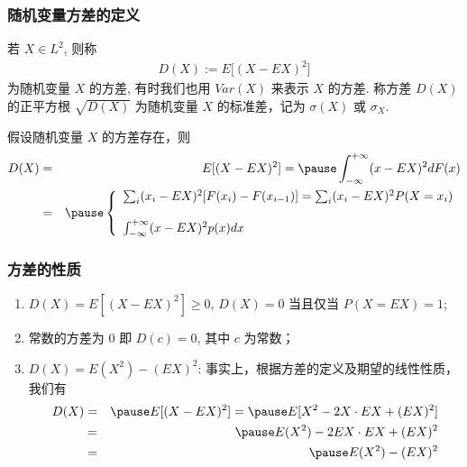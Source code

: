 \documentclass[Prob-All.tex]{subfiles}
\begin{document}
	\begin{frame}
		\frametitle{随机变量方差的定义}
		\begin{defi}
			若 $X\in L^2$, 则称%
			\begin{eqnarray*}
				D(X):=E\big[(X-EX)^2\big]
			\end{eqnarray*}
			为随机变量 $X$ 的方差, 有时我们也用 $Var (X)$ 来表示 $X$ 的方差. 称方差 $D (X)$ 的正平方根 $\sqrt{D (X)}$ 为随机变量 $X$ 的标准差，记为 $\sigma (X)$ 或 $\sigma_X$.
		\end{defi}
		\pause
		\begin{thm}
			假设随机变量 $X$ 的方差存在，则
			\begin{eqnarray*}
				D(X)&=&E[(X-EX)^2]=\pause \int_{-\infty}^{+\infty}(x-EX)^2dF(x)\\
				&=&\pause \left\{
				\begin{array}{l}
					\sum_{i}(x_i-EX)^2[F(x_i)-F(x_{i-1})]=\sum_{i}(x_i-EX)^2P(X=x_i)\\
					\\
					\int_{-\infty}^{+\infty}(x-EX)^2p(x)dx  \end{array}
				\right.
			\end{eqnarray*}

		\end{thm}

	\end{frame}
	\begin{frame}
		\frametitle{方差的性质}
		\begin{enumerate}[<+-|alert@+>]
			\item $D (X)=E[(X-EX)^2]\ge 0$, $D (X)=0$ 当且仅当 $P (X=EX)=1$;
			\item 常数的方差为 $0$ 即 $D (c)=0$, 其中 $c$ 为常数；
			\item $D (X)=E (X^2)-(EX)^2$: 事实上，根据方差的定义及期望的线性性质，我们有 \pause
			\begin{eqnarray*}
				D(X)&=&\pause E[(X-EX)^2]=\pause E[X^2-2X\cdot EX+(EX)^2]\\
				&=&\pause E(X^2)-2EX\cdot EX+(EX)^2\\
				&=&\pause E(X^2)-(EX)^2
			\end{eqnarray*}
		\end{enumerate}

	\end{frame}
\end{document}

